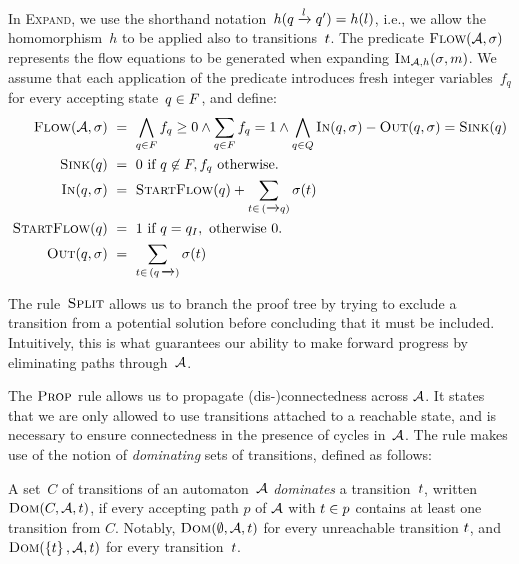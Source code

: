 In \textsc{Expand}, we use the shorthand
notation~$h(q \xrightarrow{l} q') = h(l)$,
i.e., we allow the homomorphism~$h$ to be applied also to
transitions~$t$.
%
The predicate $\textsc{Flow}(\mathcal{A}, \operatorname{\sigma})$ represents the flow
equations to be generated when expanding
$\operatorname{\textsc{Im}}_{\mathcal{A}, h}(\operatorname{\sigma}, m)$. We assume that each application of the
predicate introduces fresh integer variables~$f_q$ for every accepting
state~$q \in F$, and define:
%
\[
\begin{aligned}
  \textsc{Flow}(\mathcal{A}, \operatorname{\sigma}) &~=~
   \bigwedge\limits_{q \in F} f_q \geq 0
   \land
   \sum\limits_{q \in F} f_q = 1 \land \bigwedge\limits_{q \in Q} \operatorname{\textsc{In}}(q, \operatorname{\sigma}) - \operatorname{\textsc{Out}}(q, \operatorname{\sigma}) = \operatorname{\textsc{Sink}}(q)\\
  \operatorname{\textsc{Sink}}(q) & ~=~ 0 \text{ if } q \not\in F, f_q \text{ otherwise.} \\
  \operatorname{\textsc{In}}(q, \operatorname{\sigma}) & ~=~ \operatorname{\textsc{StartFlow}}(q) + \sum_{t \in\, (\xrightarrow{} q)} \operatorname{\sigma}(t)\\
  \operatorname{\textsc{StartFlow}}(q)  &~=~ 1 \text{ if } q = q_I, \text{ otherwise $0$.} \\
  \operatorname{\textsc{Out}}(q, \operatorname{\sigma}) &~=~ \sum_{t \in\, (q\, \xrightarrow{})} \operatorname{\sigma}(t)
\end{aligned}
\]

The rule~$\textsc{Split}{}$ allows us to branch the proof tree by trying to exclude a
transition from a potential solution before concluding that it must be included.
Intuitively, this is what guarantees our ability to make forward progress by
eliminating paths through~$\mathcal{A}$.

The $\textsc{Prop}{}$ rule allows us to propagate (dis-)connectedness
across $\mathcal{A}$. It states that we are only allowed to use
transitions attached to a reachable state, and is necessary to ensure
connectedness in the presence of cycles in~$\mathcal{A}$. The rule
makes use of the notion of \emph{dominating} sets of transitions, defined
as follows:
%
\begin{definition}
  A set~$C$ of transitions of an automaton~$\mathcal{A}$ \emph{dominates}
  a  transition~$t$, written
  $\operatorname{\textsc{Dom}}(C, \mathcal{A}, t)$, if
  every accepting path $p$ of $\mathcal{A}$
  with $t \in p$ contains at least one transition from
  $C$. Notably, $\operatorname{\textsc{Dom}}(\emptyset, \mathcal{A}, t)$ for
  every unreachable transition $t$, and
  $\operatorname{\textsc{Dom}}(\left\{t\right\}, \mathcal{A}, t)$ for every
  transition~$t$.
\end{definition}

